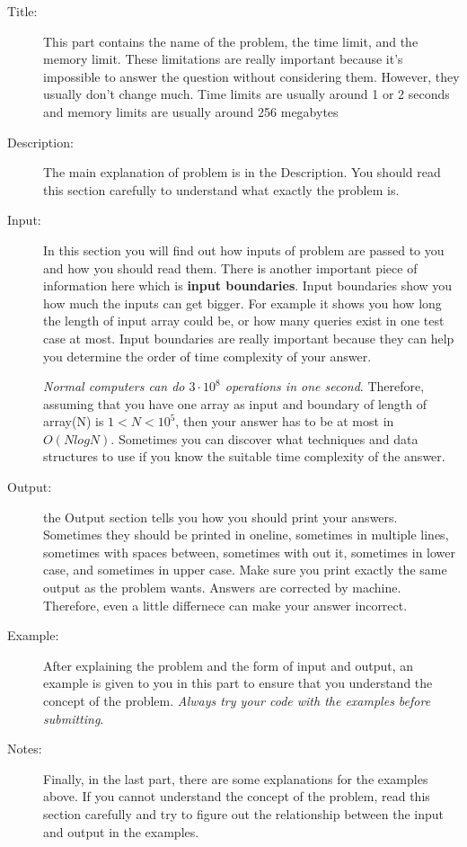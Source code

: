 \documentclass[12pt, a4paper]{article}
\begin{document}
\begin{description}
\item[Title:] This part contains the name of the problem, the time limit, and the memory limit. These limitations are really important because it's impossible to answer the question without considering them. However, they usually don't change much. Time limits are usually around 1 or 2 seconds and memory limits are usually around 256 megabytes
\item[Description:] The main explanation of problem is in the Description. You should read this section carefully to understand what exactly the problem is.
\item[Input:] In this section you will find out how inputs of problem are passed to you and how you should read them. There is another important piece of information here which is \textbf{input boundaries}. Input boundaries show you how much the inputs can get bigger. For example it shows you how long the length of input array could be, or how many queries exist in one test case at most. Input boundaries are really important because they can help you determine the order of time complexity of your answer.

\emph{Normal computers can do $3\cdot10^8$ operations in one second}. Therefore, assuming that you have one array as input and boundary of length of array(N) is $1 < N < 10^5$, then your answer has to be at most in $O(NlogN)$. Sometimes you can discover what techniques and data structures to use if you know the suitable time complexity of the answer.

\item[Output:] the Output section tells you how you should print your answers. Sometimes they should be printed in oneline, sometimes in multiple lines, sometimes with spaces between, sometimes with out it, sometimes in lower case, and sometimes in upper case. Make sure you print exactly the same output as the problem wants. Answers are corrected by machine. Therefore, even a little differnece can make your answer incorrect.
\item[Example:] After explaining the problem and the form of input and output, an example is given to you in this part to ensure that you understand the concept of the problem. \emph{Always try your code with the examples before submitting}.
\item[Notes:] Finally, in the last part, there are some explanations for the examples above. If you cannot understand the concept of the problem, read this section carefully and try to figure out the relationship between the input and output in the examples.
\end{description}
\end{document}
